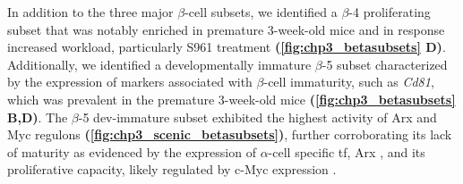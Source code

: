 
\par In addition to the three major $\beta$-cell subsets, we identified a $\beta$-4 proliferating subset that was notably enriched in premature 3-week-old mice and in response increased workload, particularly S961 treatment \textbf{(\autoref{fig:chp3_betasubsets} D)}. Additionally, we identified a developmentally immature $\beta$-5 subset characterized by the expression of markers associated with $\beta$-cell immaturity, such as \textit{Cd81}, which was prevalent in the premature 3-week-old mice \textbf{(\autoref{fig:chp3_betasubsets} B,D)}. The $\beta$-5 dev-immature subset exhibited the highest activity of Arx and Myc regulons \textbf{(\autoref{fig:chp3_scenic_betasubsets})}, further corroborating its lack of maturity as evidenced by the expression of $\alpha$-cell specific \gls{tf}, Arx \textbf{\cite{van_der_meulen_role_2015}}, and its proliferative capacity, likely regulated by c-Myc expression \textbf{\cite{dang_c-myc_1999}}.\\



